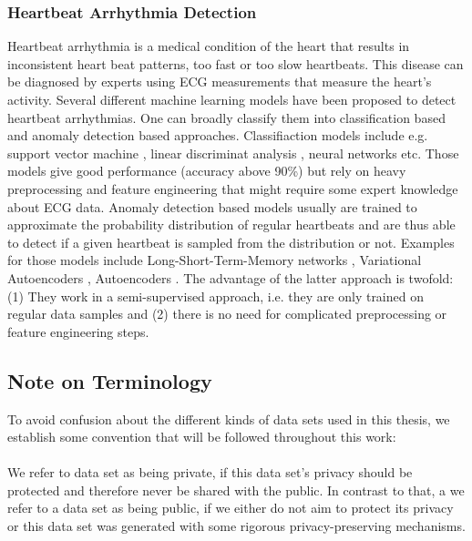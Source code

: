 \subsubsection*{Heartbeat Arrhythmia Detection}
Heartbeat arrhythmia is a medical condition of the heart that results in inconsistent heart beat patterns, too fast or too slow heartbeats. This disease can be diagnosed by experts using ECG measurements that measure the heart's activity. Several different machine learning models have been proposed to detect heartbeat arrhythmias. One can broadly classify them into classification based and anomaly detection based approaches. Classifiaction models include e.g. support vector machine \parencite{svm_ecg}, linear discriminat analysis \parencite{Chazal20041196}, neural networks \parencite{ann_ecg} etc. Those models give good performance (accuracy above 90\%) but rely on heavy preprocessing and feature engineering that might require some expert knowledge about ECG data. Anomaly detection based models usually are trained to approximate the probability distribution of regular heartbeats and are thus able to detect if a given heartbeat is sampled from the distribution or not. Examples for those models include Long-Short-Term-Memory networks \parencite{lstm_ecg}, Variational Autoencoders \parencite{matias2021robust}, Autoencoders \parencite{anobeat}. The advantage of the latter approach is twofold: (1) They work in a semi-supervised approach, i.e. they are only trained on regular data samples and (2) there is no need for complicated preprocessing or feature engineering steps.



\subsection{Note on Terminology}
To avoid confusion about the different kinds of data sets used in this thesis, we establish some convention that will be followed throughout this work:

\paragraph{}
We refer to data set as being private, if this data set's privacy should be protected and therefore never be shared with the public. In contrast to that, a we refer to a data set as being public, if we either do not aim to protect its privacy or this data set was generated with some rigorous privacy-preserving mechanisms.

